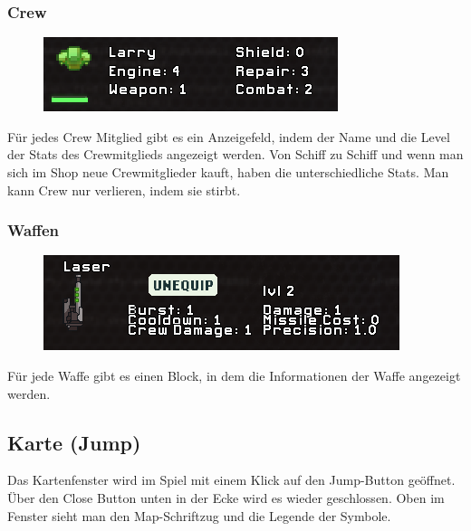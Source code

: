 \documentclass[fontsize=12pt,paper=a4,twoside]{scrartcl}
\begin{document}
\subsubsection{Crew}

\begin{figure}[H]
\centering
\includegraphics[width=0.8\linewidth]{DasSpiel/Inventar/crew.png}
\end{figure} 

Für jedes Crew Mitglied gibt es ein Anzeigefeld, indem der Name und die Level der Stats des Crewmitglieds angezeigt werden. Von Schiff zu Schiff und wenn man sich im Shop neue Crewmitglieder kauft, haben die unterschiedliche Stats. Man kann Crew nur verlieren, indem sie stirbt. 


\subsubsection{Waffen}

\begin{figure}[H]
\centering
\includegraphics[width=0.8\linewidth]{DasSpiel/Inventar/waffe.png}
\end{figure} 

Für jede Waffe gibt es einen Block, in dem die Informationen der Waffe angezeigt werden. 







\subsection{Karte (Jump)}

Das Kartenfenster wird im Spiel mit einem Klick auf den Jump-Button geöffnet. Über den Close Button unten in der Ecke wird es wieder geschlossen. Oben im Fenster sieht man den Map-Schriftzug und die Legende der Symbole.
\end{document}
